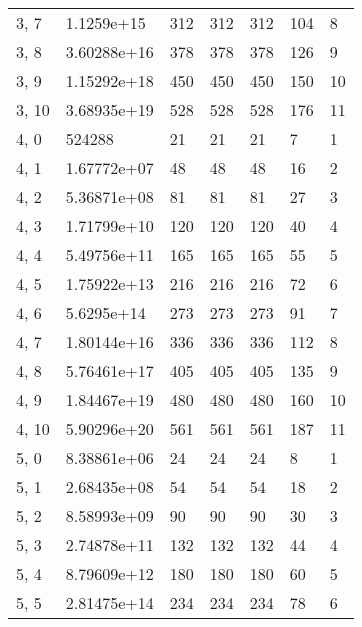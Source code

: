 \begin{table}
\begin{tabular}{lllllll}
3, 7   &   1.1259e+15 &         312 &       312 &         312 &      104 &     8 \\
3, 8   &  3.60288e+16 &         378 &       378 &         378 &      126 &     9 \\
3, 9   &  1.15292e+18 &         450 &       450 &         450 &      150 &    10 \\
3, 10  &  3.68935e+19 &         528 &       528 &         528 &      176 &    11 \\
4, 0   &       524288 &          21 &        21 &          21 &        7 &     1 \\
4, 1   &  1.67772e+07 &          48 &        48 &          48 &       16 &     2 \\
4, 2   &  5.36871e+08 &          81 &        81 &          81 &       27 &     3 \\
4, 3   &  1.71799e+10 &         120 &       120 &         120 &       40 &     4 \\
4, 4   &  5.49756e+11 &         165 &       165 &         165 &       55 &     5 \\
4, 5   &  1.75922e+13 &         216 &       216 &         216 &       72 &     6 \\
4, 6   &   5.6295e+14 &         273 &       273 &         273 &       91 &     7 \\
4, 7   &  1.80144e+16 &         336 &       336 &         336 &      112 &     8 \\
4, 8   &  5.76461e+17 &         405 &       405 &         405 &      135 &     9 \\
4, 9   &  1.84467e+19 &         480 &       480 &         480 &      160 &    10 \\
4, 10  &  5.90296e+20 &         561 &       561 &         561 &      187 &    11 \\
5, 0   &  8.38861e+06 &          24 &        24 &          24 &        8 &     1 \\
5, 1   &  2.68435e+08 &          54 &        54 &          54 &       18 &     2 \\
5, 2   &  8.58993e+09 &          90 &        90 &          90 &       30 &     3 \\
5, 3   &  2.74878e+11 &         132 &       132 &         132 &       44 &     4 \\
5, 4   &  8.79609e+12 &         180 &       180 &         180 &       60 &     5 \\
5, 5   &  2.81475e+14 &         234 &       234 &         234 &       78 &     6 \\

\end{tabular}
\end{table}
